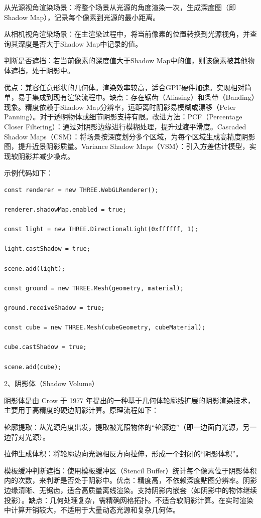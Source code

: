 从光源视角渲染场景：将整个场景从光源的角度渲染一次，生成深度图（即 Shadow Map），记录每个像素到光源的最小距离。

从相机视角渲染场景：在主渲染过程中，将当前像素的位置转换到光源视角，并查询其深度是否大于Shadow Map中记录的值。

判断是否遮挡：若当前像素的深度值大于Shadow Map中的值，则该像素被其他物体遮挡，处于阴影中。

优点：兼容任意形状的几何体。渲染效率较高，适合GPU硬件加速。实现相对简单，易于集成到现有渲染流程中。缺点：存在锯齿（Aliasing）和条带（Banding）现象。精度依赖于Shadow Map分辨率，远距离时阴影易模糊或漂移（Peter Panning）。对于透明物体或细节阴影支持有限。改进方法：PCF（Percentage Closer Filtering）：通过对阴影边缘进行模糊处理，提升过渡平滑度。Cascaded Shadow Maps（CSM）：将场景按深度划分多个区域，为每个区域生成高精度阴影图，提升近景阴影质量。Variance Shadow Maps（VSM）：引入方差估计模型，实现软阴影并减少噪点。

示例代码如下：

\begin{lstlisting}[style=javascript]
const renderer = new THREE.WebGLRenderer();

renderer.shadowMap.enabled = true;

const light = new THREE.DirectionalLight(0xffffff, 1);

light.castShadow = true;

scene.add(light);

const ground = new THREE.Mesh(geometry, material);

ground.receiveShadow = true;

const cube = new THREE.Mesh(cubeGeometry, cubeMaterial);

cube.castShadow = true;

scene.add(cube);
\end{lstlisting}

2、阴影体（Shadow Volume）

阴影体是由 Crow 于 1977 年提出的一种基于几何体轮廓线扩展的阴影渲染技术，主要用于高精度的硬边阴影计算。原理流程如下：

轮廓提取：从光源角度出发，提取被光照物体的``轮廓边''（即一边面向光源，另一边背对光源）。

拉伸生成体积：将轮廓边向光源相反方向拉伸，形成一个封闭的``阴影体积''。

模板缓冲判断遮挡：使用模板缓冲区（Stencil Buffer）统计每个像素位于阴影体积内的次数，来判断是否处于阴影中。优点：精度高，不依赖深度贴图分辨率。阴影边缘清晰、无锯齿，适合高质量离线渲染。支持阴影内嵌套（如阴影中的物体继续投影）。缺点：几何处理复杂，需精确网格拓扑。不适合软阴影计算。在实时渲染中计算开销较大，不适用于大量动态光源和复杂几何体。

